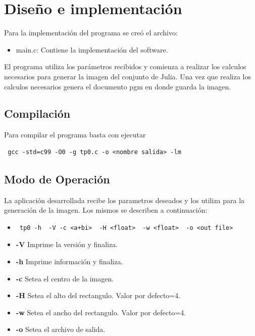		
\section{Diseño e implementación}
Para la implementación del programa se creó el archivo:
\begin{itemize}
	\item main.c: Contiene la implementación del software.
\end{itemize}

El programa utiliza los parámetros recibidos y comienza a realizar los calculos necesarios para generar la imagen del conjunto de Julia. Una vez que realiza los
calculos necesarios genera el documento pgm en donde guarda la imagen.

\subsection{Compilación}
Para compilar el programa basta con ejecutar 

\bigskip	
\begin{verbatim} gcc -std=c99 -O0 -g tp0.c -o <nombre salida> -lm \end{verbatim}


\subsection{Modo de Operación}
		La aplicación desarrollada recibe los parametros deseados y los utiliza para la generación de la imagen. Los mismos se describen a continuación:
		
		\begin{itemize}
			\item \begin{verbatim} tp0 -h  -V -c <a+bi>  -H <float>  -w <float>  -o <out file> \end{verbatim}
			\item \textbf{-V} Imprime la versión y finaliza.
			\item \textbf{-h} Imprime información y finaliza.
			\item \textbf{-c} Setea el centro de la imagen.
			\item \textbf{-H} Setea el alto del rectangulo. Valor por defecto=4.
			\item \textbf{-w} Setea el ancho del rectangulo. Valor por defecto=4.
			\item \textbf{-o} Setea el archivo de salida.
		\end{itemize}


